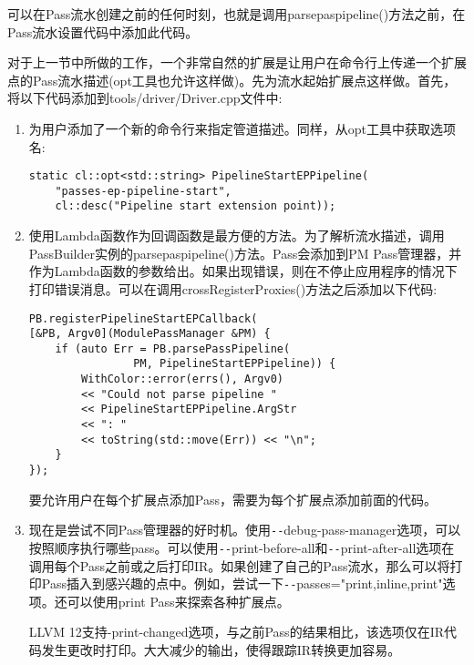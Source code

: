 可以在Pass流水创建之前的任何时刻，也就是调用parsepaspipeline()方法之前，在Pass流水设置代码中添加此代码。\par

对于上一节中所做的工作，一个非常自然的扩展是让用户在命令行上传递一个扩展点的Pass流水描述(opt工具也允许这样做)。先为流水起始扩展点这样做。首先，将以下代码添加到tools/driver/Driver.cpp文件中:\par

\begin{enumerate}
\item 为用户添加了一个新的命令行来指定管道描述。同样，从opt工具中获取选项名:
\begin{lstlisting}[caption={}]
static cl::opt<std::string> PipelineStartEPPipeline(
	"passes-ep-pipeline-start",
	cl::desc("Pipeline start extension point));
\end{lstlisting}

\item 使用Lambda函数作为回调函数是最方便的方法。为了解析流水描述，调用PassBuilder实例的parsepaspipeline()方法。Pass会添加到PM Pass管理器，并作为Lambda函数的参数给出。如果出现错误，则在不停止应用程序的情况下打印错误消息。可以在调用crossRegisterProxies()方法之后添加以下代码:
\begin{lstlisting}[caption={}]
PB.registerPipelineStartEPCallback(
[&PB, Argv0](ModulePassManager &PM) {
	if (auto Err = PB.parsePassPipeline(
				PM, PipelineStartEPPipeline)) {
		WithColor::error(errs(), Argv0)
		<< "Could not parse pipeline "
		<< PipelineStartEPPipeline.ArgStr 
		<< ": "
		<< toString(std::move(Err)) << "\n";
	}
});
\end{lstlisting}
\begin{tcolorbox}[colback=blue!5!white,colframe=blue!75!black, title=Tip]
要允许用户在每个扩展点添加Pass，需要为每个扩展点添加前面的代码。
\end{tcolorbox}

\item 现在是尝试不同Pass管理器的好时机。使用\verb|--|debug-pass-manager选项，可以按照顺序执行哪些pass。可以使用\verb|--|print-before-all和\verb|--|print-after-all选项在调用每个Pass之前或之后打印IR。如果创建了自己的Pass流水，那么可以将打印Pass插入到感兴趣的点中。例如，尝试一下\verb|--|passes="print,inline,print"选项。还可以使用print Pass来探索各种扩展点。

\begin{tcolorbox}[colback=blue!5!white,colframe=mymauve!75!black, title=LLVM 12的新打印选项]
LLVM 12支持-print-changed选项，与之前Pass的结果相比，该选项仅在IR代码发生更改时打印。大大减少的输出，使得跟踪IR转换更加容易。
\end{tcolorbox}


\end{enumerate}
